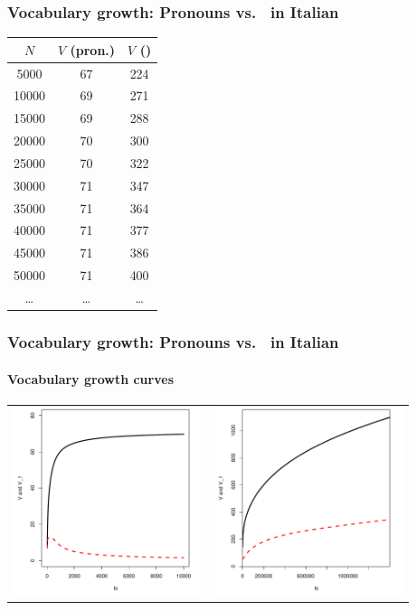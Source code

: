 \documentclass[t]{beamer} %
\begin{document}
\begin{frame}
  \frametitle{Vocabulary growth: Pronouns vs.\ \textcite{ri-} in Italian}

  \begin{center}
    \begin{tabular}{c||c|c}
      $N$ & $V$ (pron.) & $V$ (\textcite{ri-}) \\
      \hline
       \phantom{0}5000 & 67 & 224 \\
       10000 & 69 & 271 \\
       15000 & 69 & 288 \\
       20000 & 70 & 300 \\
       25000 & 70 & 322 \\
       30000 & 71 & 347 \\
       35000 & 71 & 364 \\
       40000 & 71 & 377 \\
       45000 & 71 & 386 \\
       50000 & 71 & 400 \\
       \ldots & \ldots & \ldots
    \end{tabular}
  \end{center}
\end{frame}

\begin{frame}
  \frametitle{Vocabulary growth: Pronouns vs.\ \textcite{ri-} in Italian}
  \framesubtitle{Vocabulary growth curves}

  \hspace{-1cm}%
  \begin{tabular}{cc}
    \includegraphics[height=55mm]{img/pro-sub-bin-vgc} &
    \includegraphics[height=55mm]{img/ita-ri-vgc}
  \end{tabular}
\end{frame}
\end{document}
